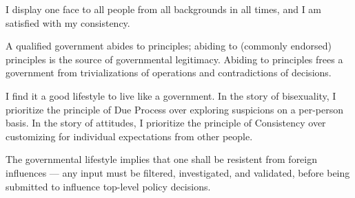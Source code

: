I display one face to all people from all backgrounds in all times,
and I am satisfied with my consistency.

A qualified government abides to principles; abiding to (commonly endorsed) principles is the source of governmental legitimacy.
Abiding to principles frees a government from trivializations of operations and contradictions of decisions.

I find it a good lifestyle to live like a government.
In the story of bisexuality, I prioritize the principle of Due Process over exploring suspicions on a per-person basis.
In the story of attitudes, I prioritize the principle of Consistency over customizing for individual expectations from other people.

The governmental lifestyle implies that one shall be resistent from foreign influences ---
any input must be filtered, investigated, and validated, before being submitted to influence top-level policy decisions.


